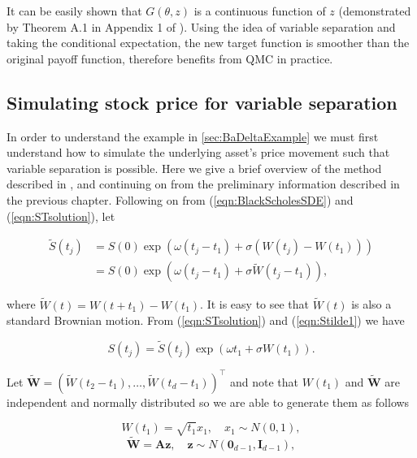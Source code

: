 It can be easily shown that $G(\theta,z)$ is a continuous function of $z$ (demonstrated by Theorem A.1 in Appendix 1 of \cite{ZhangConditionalQuasiMonteCarloMethod}). Using the idea of variable separation and taking the conditional expectation, the new target function is smoother than the original payoff function, therefore benefits from QMC in practice.

\subsection{Simulating stock price for variable separation} \label{sec:VariableSeparationPathSimulation}
In order to understand the example in \ref{sec:BaDeltaExample} we must first understand how to simulate the underlying asset's price movement such that variable separation is possible. Here we give a brief overview of the method described in \cite{ZhangConditionalQuasiMonteCarloMethod}, and continuing on from the preliminary information described in the previous chapter. Following on from (\ref{eqn:BlackScholesSDE}) and (\ref{eqn:STsolution}), let

\begin{equation} \label{eqn:Stilde1}
\begin{aligned}
    \widetilde{S}(t_j) &= S(0)\exp{(\omega(t_j - t_1) + \sigma(W(t_j) - W(t_1)))} \\
    &= S(0)\exp{(\omega(t_j - t_1) + \sigma\widetilde{W}(t_j - t_1))},
\end{aligned}
\end{equation}

where $\widetilde{W}(t) = W(t + t_1) - W(t_1)$. It is easy to see that $\widetilde{W}(t)$ is also a standard Brownian motion. From (\ref{eqn:STsolution}) and (\ref{eqn:Stilde1}) we have

\begin{equation}
    S(t_j) = \widetilde{S}(t_j)\exp{(\omega t_1 + \sigma W(t_1))}.
\end{equation}

Let $\widetilde{\boldsymbol{W}} = (\widetilde{W}(t_2 - t_1),\dots,\widetilde{W}(t_d - t_1))^\top$ and note that $W(t_1)$ and $\widetilde{\boldsymbol{W}}$ are independent and normally distributed so we are able to generate them as follows

\begin{equation}
    W(t_1) = \sqrt{t_1}x_1, \quad x_1 \sim N(0, 1),
\end{equation}
\begin{equation} \label{eqn:WboldTilde}
    \widetilde{\boldsymbol{W}} = \boldsymbol{Az}, \quad \boldsymbol{z} \sim N(\boldsymbol{0}_{d-1}, \boldsymbol{I}_{d-1}),
\end{equation}

